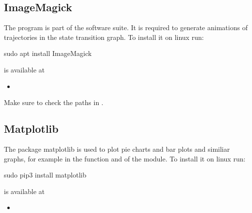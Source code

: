 \documentclass[letterpaper,10pt,english]{sphinxmanual}
\begin{document}
\subsection{ImageMagick}
\label{\detokenize{Installation:imagemagick}}\label{\detokenize{Installation:installation-imagemagick}}
The program  is part of the  software suite.
It is required to generate animations of trajectories in the state transition graph.
To install it on linux run:

\begin{sphinxVerbatim}[commandchars=\\\{\}]
\PYGZdl{} sudo apt install ImageMagick
\end{sphinxVerbatim}

 is available at
\begin{itemize}
\item {} 

\end{itemize}

Make sure to check the paths in .


\subsection{Matplotlib}
\label{\detokenize{Installation:matplotlib}}\label{\detokenize{Installation:installation-matplotlib}}
The package matplotlib is used to plot pie charts and bar plots and similiar graphs,
for example in the function {\hyperref[\detokenize{Basins:create-barplot}]{}} and {\hyperref[\detokenize{Basins:basins-create-piechart}]{}} of the {\hyperref[\detokenize{Basins:basins}]{}} module.
To install it on linux run:

\begin{sphinxVerbatim}[commandchars=\\\{\}]
\PYGZdl{} sudo pip3 install matplotlib
\end{sphinxVerbatim}

 is available at
\begin{itemize}
\item {} 

\end{itemize}
\end{document}
